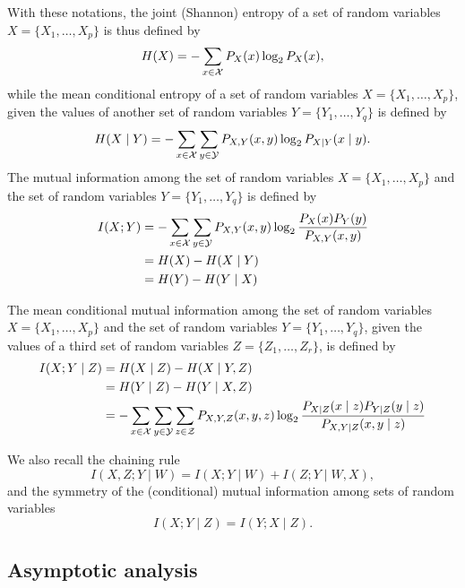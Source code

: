 With these notations, the joint (Shannon) entropy of a set of random variables
$X =\{X_{1}, \ldots , X_{p}\}$ is thus defined by
\begin{equation}
H(X)  = - \sum_{x \in {\cal X}}P_{X} (x)\log_{2}P_{X }(x),
\end{equation}
while the mean conditional entropy of a set of random variables $X = \{X_{1},
\ldots , X_{p}\}$, given the values of another set of random variables
$Y=\{Y_{1}, \ldots , Y_{q}\}$ is defined by
\begin{equation}
H(X\mid Y) = - \sum_{x \in {\cal X}} \sum_{y \in {\cal Y}} P_{X, Y} (x, y) \log_{2} P_{X \mid Y} (x  \mid y).
 \end{equation}
The mutual information among the set of random variables $X =\{X_{1}, \ldots ,
X_{p}\}$ and the set of random variables $Y=\{Y_{1}, \ldots , Y_{q}\}$ is
defined by
 \begin{align}
 I(X; Y) &= - \sum_{x \in {\cal X}} \sum_{y \in {\cal Y}} P_{X, Y} (x, y) \log_{2} \frac{P_{X}(x) P_{Y}(y)}{P_{X,Y}(x,y)} \\
 &= H(X) - H(X \mid Y) \nonumber \\
 &=  H(Y) - H(Y \mid X) \nonumber
 \end{align}

The mean conditional mutual information among the set of random variables $X
=\{X_{1}, \ldots , X_{p}\}$ and the set of random variables $Y=\{Y_{1}, \ldots
, Y_{q}\}$, given the values of a third set of random variables $Z=\{Z_{1},
\ldots , Z_{r}\}$, is defined by
 \begin{align}
 I(X; Y \mid Z) &= H(X \mid Z) - H(X \mid Y, Z)\\
 & = H(Y \mid Z) - H(Y \mid X, Z) \nonumber\\
& = - \sum_{x \in {\cal X}} \sum_{y \in {\cal Y}} \sum_{z \in {\cal Z}} P_{X, Y, Z} (x, y, z) \log_{2} \frac{P_{X \mid Z}(x \mid z) P_{Y\mid Z}(y \mid z)}{P_{X,Y \mid Z}(x,y \mid z)}\nonumber
\end{align}

We also recall the chaining rule
\begin{equation}
I(X, Z ; Y \mid W ) = I(X; Y \mid W  ) + I( Z ; Y \mid W, X),
\end{equation}
and the symmetry of the (conditional) mutual information among sets of random variables
\begin{equation}
I(X ; Y \mid Z) = I(Y ;  X  \mid Z).
\end{equation}


\subsection{Asymptotic analysis}


